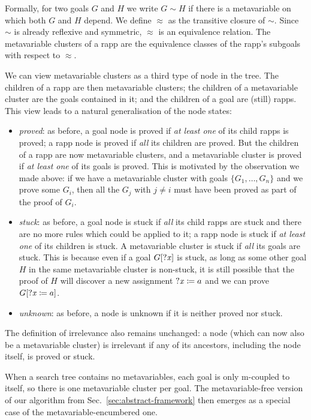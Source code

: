 Formally, for two goals $G$ and $H$ we write $G \sim H$ if there is a
metavariable on which both $G$ and $H$ depend. We define $\approx$ as the
transitive closure of $\sim$. Since $\sim$ is already reflexive and symmetric,
$\approx$ is an equivalence relation. The metavariable clusters of a rapp are
the equivalence classes of the rapp's subgoals with respect to $\approx$.

We can view metavariable clusters as a third type of node in the tree. The
children of a rapp are then metavariable clusters; the children of a
metavariable cluster are the goals contained in it; and the children of a goal
are (still) rapps. This view leads to a natural generalisation of the node
states:
\begin{itemize}
  \item \emph{proved}: as before, a goal node is proved if \emph{at least one}
        of its child rapps is proved; a rapp node is proved if \emph{all} its
        children are proved. But the children of a rapp are now metavariable
        clusters, and a metavariable cluster is proved if \emph{at least one} of
        its goals is proved. This is motivated by the observation we made above:
        if we have a metavariable cluster with goals $\{ G_{1}, \dots, G_{n}\}$
        and we prove some $G_{i}$, then all the $G_{j}$ with $j ≠ i$ must have
        been proved as part of the proof of $G_{i}$.
  \item \emph{stuck}: as before, a goal node is stuck if \emph{all} its child
        rapps are stuck and there are no more rules which could be applied to
        it; a rapp node is stuck if \emph{at least one} of its children is
        stuck. A metavariable cluster is stuck if \emph{all} its goals are
        stuck. This is because even if a goal $G[\mathit{?x}]$ is stuck, as long as
        some other goal $H$ in the same metavariable cluster is non-stuck, it is
        still possible that the proof of $H$ will discover a new assignment
        $\mathit{?x} \coloneqq a$ and we can prove $G[\mathit{?x} \coloneqq a]$.
  \item \emph{unknown}: as before, a node is unknown if it is neither proved nor
        stuck.
\end{itemize}
The definition of irrelevance also remains unchanged: a node (which can now also
be a metavariable cluster) is irrelevant if any of its ancestors, including the
node itself, is proved or stuck.

When a search tree contains no metavariables, each goal is only m-coupled to
itself, so there is one metavariable cluster per goal. The metavariable-free
version of our algorithm from Sec.~\ref{sec:abstract-framework} then emerges as
a special case of the metavariable-encumbered one.


